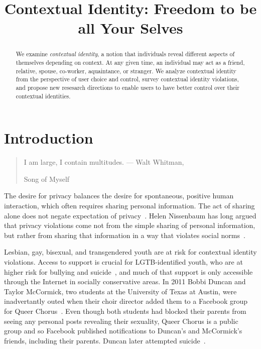 \documentclass[10pt, conference, compsocconf]{IEEEtran}
\begin{document}
\title{Contextual Identity: Freedom to be all Your Selves}

\author{
}
\maketitle

\begin{abstract}
We examine \textit{contextual identity}, a notion that individuals reveal
different aspects of themselves depending on context. At any given time,
an individual may act as a friend, relative, spouse, co-worker, aquaintance, or
stranger. We analyze contextual identity from the perspective of user choice
and control, survey contextual identity violations, and propose new resesarch
directions to enable users to have better control over their contextual
identities.
\end{abstract}

\section{Introduction}
\begin{quote}I am large, I contain multitudes. --- Walt Whitman,
\begin{em}Song of Myself\end{em} \end{quote}

The desire for privacy balances the desire for spontaneous, positive human
interaction, which often requires sharing personal information. The act of
sharing alone does not negate expectation of privacy~\cite{boyd2}.
Helen Nissenbaum has long argued that privacy violations come not from the
simple sharing of personal information, but rather from sharing that
information in a way that violates social norms~\cite{nissenbaum}.

Lesbian, gay, bisexual, and transgendered youth are at risk for contextual
identity violations.  Access to support is crucial for LGTB-identified youth,
who are at higher risk for bullying and suicide~\cite{hrc}, and
much of that support is only accessible through the Internet in socially
conservative areas. In 2011 Bobbi Duncan and Taylor McCormick, two
students at the University of Texas at Austin, were inadvertantly outed when
their choir director added them to a Facebook group for Queer
Chorus~\cite{fowler}. Even though both students had blocked their parents from
seeing any personal posts revealing their sexuality, Queer Chorus is a
public group and so Facebook published notifications to Duncan's and McCormick's
friends, including their parents. Duncan later attempted suicide~\cite{duncan}.
\end{document}
